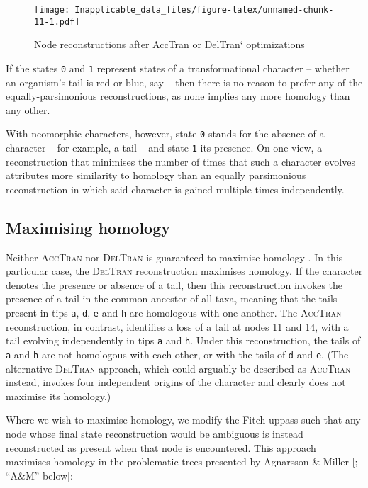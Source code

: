 \documentclass[]{book}
\theoremstyle{definition}
\theoremstyle{definition}
\theoremstyle{definition}
\theoremstyle{remark}
\begin{document}
\begin{figure}
\centering
\texttt{[image: Inapplicable\_data\_files/figure-latex/unnamed-chunk-11-1.pdf]}
\caption{\label{fig:unnamed-chunk-11}Node reconstructions after AccTran or
DelTran` optimizations}
\end{figure}

If the states \texttt{0} and \texttt{1} represent states of a
transformational character -- whether an organism's tail is red or blue,
say -- then there is no reason to prefer any of the equally-parsimonious
reconstructions, as none implies any more homology than any other.

With neomorphic characters, however, state \texttt{0} stands for the
absence of a character -- for example, a tail -- and state \texttt{1}
its presence. On one view, a reconstruction that minimises the number of
times that such a character evolves attributes more similarity to
homology than an equally parsimonious reconstruction in which said
character is gained multiple times independently.

\hypertarget{maximising-homology}{%
\subsection{Maximising homology}\label{maximising-homology}}

Neither \textsc{AccTran} nor \textsc{DelTran} is guaranteed to maximise
homology \citep{Agnarsson2008}. In this particular case, the
\textsc{DelTran} reconstruction maximises homology. If the character
denotes the presence or absence of a tail, then this reconstruction
invokes the presence of a tail in the common ancestor of all taxa,
meaning that the tails present in tips \texttt{a}, \texttt{d},
\texttt{e} and \texttt{h} are homologous with one another. The
\textsc{AccTran} reconstruction, in contrast, identifies a loss of a
tail at nodes 11 and 14, with a tail evolving independently in tips
\texttt{a} and \texttt{h}. Under this reconstruction, the tails of
\texttt{a} and \texttt{h} are not homologous with each other, or with
the tails of \texttt{d} and \texttt{e}. (The alternative
\textsc{DelTran} approach, which could arguably be described as
\textsc{AccTran} instead, invokes four independent origins of the
character and clearly does not maximise its homology.)

Where we wish to maximise homology, we modify the Fitch uppass such that
any node whose final state reconstruction would be ambiguous is instead
reconstructed as present when that node is encountered. This approach
maximises homology in the problematic trees presented by Agnarsson \&
Miller {[}\citeyearpar{Agnarsson2008}; ``A\&M'' below{]}:
\end{document}

